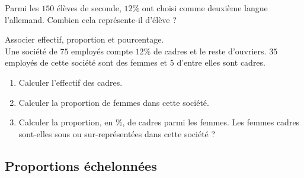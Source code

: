 \begin{Exemple}
Parmi les $150$ élèves de seconde, $12\%$ ont choisi comme deuxième langue l'allemand. Combien cela représente-il d'élève ?
\vspace{0.1cm}

\ligne

\end{Exemple}

\begin{Méthode}Associer effectif, proportion et pourcentage. \\
Une société de $75$ employés compte $12 \%$ de cadres et le reste d'ouvriers. $35$ employés de cette société sont des femmes et $5$ d'entre elles sont cadres. 
\begin{enumerate}
\item Calculer l'effectif des cadres.

\ligne

\item Calculer la proportion de femmes dans cette société.

\ligne

\ligne
     
\item Calculer la proportion, en $\%$, de cadres parmi les femmes. Les femmes cadres sont-elles sous ou sur-représentées dans cette société ?

\ligne

\ligne

\ligne

\ligne

\end{enumerate}
\end{Méthode}

\newpage

\subsection{Proportions échelonnées}

